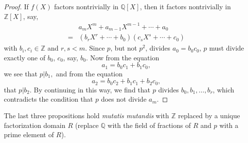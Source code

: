 \documentclass[a4paper,11pt,final,openany]{memoir}
\theoremstyle{nonumberplain}
\newtheorem{proof}{Proof.}
\begin{document}
\begin{proof}
If $f(X)$ factors nontrivially in $\mathbb{Q}[X]$, then it factors
nontrivially in $\mathbb{Z}[X]$, say,
\begin{align*}
  &a_{m}X^{m}+a_{m-1}X^{m-1}+\cdots+a_{0}\\
  =&(b_{r}X^{r}+\cdots+b_{0})(c_{s}%
X^{s}+\cdots+c_{0})
\end{align*}
with $b_{i},c_{i}\in\mathbb{Z}$ and $r,s<m$. Since $p$, but not $p^{2}$,
divides $a_{0}=b_{0}c_{0}$, $p$ must divide exactly one of $b_{0}$, $c_{0}$,
say, $b_{0}$. Now from the equation
\[
a_{1}=b_{0}c_{1}+b_{1}c_{0},
\]
we see that $p|b_{1},$ and from the equation
\[
a_{2}=b_{0}c_{2}+b_{1}c_{1}+b_{2}c_{0},
\]
that $p|b_{2}$. By continuing in this way, we find that $p$ divides
$b_{0},b_{1},\ldots,b_{r}$, which contradicts the condition that $p$ does not
divide $a_{m}$.
\end{proof}

The last three propositions hold \textit{mutatis mutandis} with $\mathbb{Z}$
replaced by a unique factorization domain $R$ (replace $\mathbb{Q}{}$ with the
field of fractions of $R$ and $p$ with a prime element of $R$).
\end{document}
